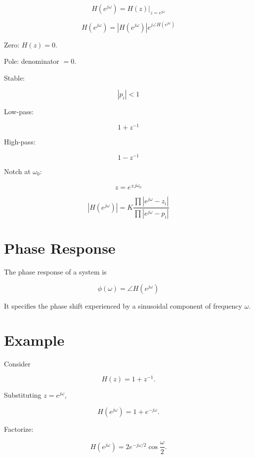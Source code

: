 
\begin{tcolorbox}[title=One-Minute Revision,colback=blue!5]

\[
H(e^{j\omega})=H(z)|_{z=e^{j\omega}}
\]

\[
H(e^{j\omega})=
|H(e^{j\omega})|e^{j\angle H(e^{j\omega})}
\]

Zero: \(H(z)=0\).

Pole: denominator \(=0\).

Stable:

\[
|p_i|<1
\]

Low-pass:

\[
1+z^{-1}
\]

High-pass:

\[
1-z^{-1}
\]

Notch at \(\omega_0\):

\[
z=e^{\pm j\omega_0}
\]

\[
|H(e^{j\omega})|=
K
\frac{\prod |e^{j\omega}-z_i|}
{\prod |e^{j\omega}-p_i|}
\]

\end{tcolorbox}
\section{Phase Response}

The phase response of a system is

\[
\boxed{
\phi(\omega)=\angle H(e^{j\omega})
}
\]

It specifies the phase shift experienced by a sinusoidal component of frequency
\(\omega\).


\section{Example}

Consider

\[
H(z)=1+z^{-1}.
\]

Substituting \(z=e^{j\omega}\),

\[
H(e^{j\omega})=
1+e^{-j\omega}.
\]

Factorize:

\[
H(e^{j\omega})=
2e^{-j\omega/2}\cos\frac{\omega}{2}.
\]

